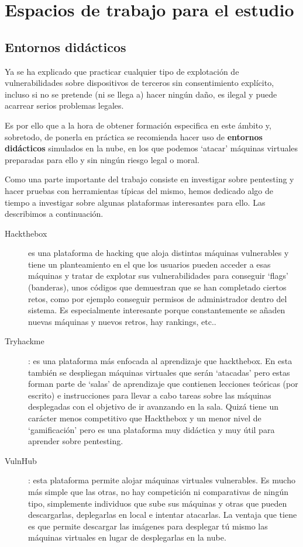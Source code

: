 \chapter{Espacios de trabajo para el estudio}

\section{Entornos didácticos}\label{entornos_didacticos}

Ya se ha explicado que practicar cualquier tipo de explotación de vulnerabilidades sobre dispositivos de terceros sin consentimiento explícito, incluso si no se pretende (ni se llega a) hacer ningún daño, es ilegal y puede acarrear serios problemas legales.

Es por ello que a la hora de obtener formación especifica en este ámbito y, sobretodo, de ponerla en práctica se recomienda hacer uso de \textbf{entornos didácticos} simulados en la nube, en los que podemos `atacar' máquinas virtuales preparadas para ello y sin ningún riesgo legal o moral.

Como una parte importante del trabajo consiste en investigar sobre pentesting y hacer pruebas con herramientas típicas del mismo, hemos dedicado algo de tiempo a investigar sobre algunas plataformas interesantes para ello. Las describimos a continuación.

\begin{description}
    \item[Hackthebox] es una plataforma de hacking que aloja distintas máquinas vulnerables y tiene un planteamiento en el que los usuarios pueden acceder a esas máquinas y tratar de explotar sus vulnerabilidades para conseguir `flags' (banderas), unos códigos que demuestran que se han completado ciertos retos, como por ejemplo conseguir permisos de administrador dentro del sistema. Es especialmente interesante porque constantemente se añaden nuevas máquinas y nuevos retros, hay rankings, etc..
    \item[Tryhackme]: es una plataforma más enfocada al aprendizaje que hackthebox. En esta también se despliegan máquinas virtuales que serán `atacadas' pero estas forman parte de `salas' de aprendizaje que contienen lecciones teóricas (por escrito) e instrucciones para llevar a cabo tareas sobre las máquinas desplegadas con el objetivo de ir avanzando en la sala. Quizá tiene un carácter menos competitivo que Hackthebox y un menor nivel de `gamificación' pero es una plataforma muy didáctica y muy útil para aprender sobre pentesting.
    \item[VulnHub]: esta plataforma permite alojar máquinas virtuales vulnerables. Es mucho más simple que las otras, no hay competición ni comparativas de ningún tipo, simplemente individuos que sube sus máquinas y otras que pueden descargarlas, deplegarlas en local e intentar atacarlas. La ventaja que tiene es que permite descargar las imágenes para desplegar tú mismo las máquinas virtuales en lugar de desplegarlas en la nube.
\end{description}

